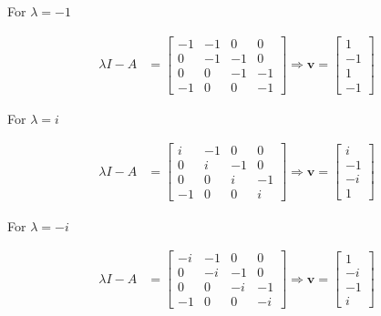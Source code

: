 \documentclass[12pt,a4paper]{article}
\begin{document}
For $\lambda = -1$

\begin{align*}
	\lambda I - A &= \begin{bmatrix}
		-1 & -1 & 0 & 0 \\
		0 &- 1 & -1 & 0 \\
		0 & 0 & -1 & -1 \\
		-1 & 0 & 0 &- 1
	\end{bmatrix} \Rightarrow \mathbf v = \begin{bmatrix}
		1 \\ -1\\ 1\\ -1
	\end{bmatrix}
\end{align*}

For $\lambda = i$

\begin{align*}
	\lambda I - A &= \begin{bmatrix}
		i & -1 & 0 & 0 \\
		0 & i & -1 & 0 \\
		0 & 0 & i & -1 \\
		-1 & 0 & 0 & i
	\end{bmatrix} \Rightarrow \mathbf v = \begin{bmatrix}
		i  \\ -1 \\ -i \\ 1
	\end{bmatrix}
\end{align*}

For $\lambda = -i$

\begin{align*}
	\lambda I - A &= \begin{bmatrix}
		-i & -1 & 0 & 0 \\
		0 & -i & -1 & 0 \\
		0 & 0 & -i & -1 \\
		-1 & 0 & 0 & -i
	\end{bmatrix} \Rightarrow \mathbf v = \begin{bmatrix}
		1 \\ -i \\ -1  \\ i 
	\end{bmatrix}
\end{align*}

\par\nopagebreak\vspace{3cm}
\end{document}
